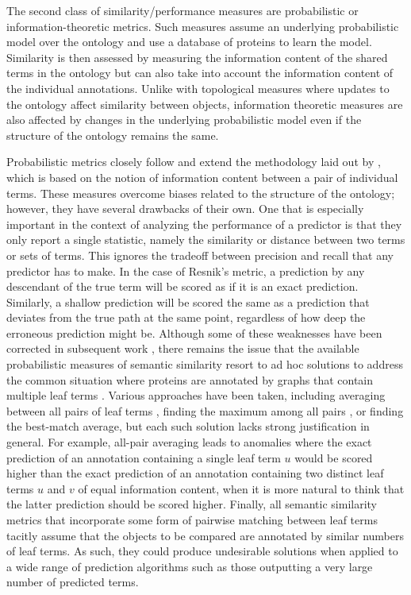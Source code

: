The second class of similarity/performance measures are probabilistic or information-theoretic metrics. Such measures assume an underlying probabilistic model over the ontology and use a database of proteins to learn the model. Similarity is then assessed by measuring the information content of the shared terms in the ontology but can also take into account the information content of the individual annotations. Unlike with topological measures where updates to the ontology  affect similarity between objects, information theoretic measures are also affected by changes in the underlying probabilistic model even if the structure of the ontology remains the same.

Probabilistic metrics closely follow and extend the methodology laid out by \cite{Resnik1995}, which is based on the notion of information content between a pair of individual terms. These measures overcome biases related to the structure of the ontology; however, they have several drawbacks of their own. One that is especially important in the context of analyzing the performance of a predictor is that they only report a single statistic, namely the similarity or distance between two terms or sets of terms. This ignores the tradeoff between precision and recall that any predictor has to make. In the case of Resnik's metric, a prediction by any descendant of the true term will be scored as if it is an exact prediction. Similarly, a shallow prediction will be scored the same as a prediction that deviates from the true path at the same point, regardless of how deep the erroneous prediction might be. Although some of these weaknesses have been corrected in subsequent work \citep{Jiang1997,Lin1998,Schlicker2006}, there remains the issue that the available probabilistic measures of semantic similarity resort to ad hoc solutions to address the common situation where proteins are annotated by graphs that contain multiple leaf terms \citep{Clark2011}. Various approaches have been taken, including averaging between all pairs of leaf terms \citep{Lord2003}, finding the maximum among all pairs \citep{Resnik1999}, or finding the best-match average, but each such solution lacks strong justification in general. For example, all-pair averaging leads to anomalies where the exact prediction of an annotation containing a single leaf term $u$ would be scored higher than the exact prediction of an annotation containing two distinct leaf terms $u$ and $v$ of equal information content, when it is more natural to think that the latter prediction should be scored higher. Finally, all semantic similarity metrics that incorporate some form of pairwise matching between leaf terms tacitly assume that the objects to be compared are annotated by similar numbers of leaf terms. As such, they could produce undesirable solutions when applied to a wide range of prediction algorithms such as those outputting a very large number of predicted terms.


